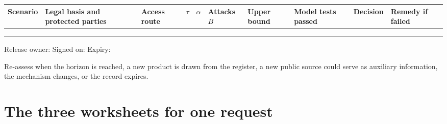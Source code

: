 \begin{center}
\footnotesize
\setlength{\tabcolsep}{2.5pt}
\begin{tabular}{@{}>{\raggedright\arraybackslash}p{1.5cm}>{\raggedright\arraybackslash}p{1.8cm}>{\raggedright\arraybackslash}p{1.3cm}>{\raggedright\arraybackslash}p{0.6cm}>{\raggedright\arraybackslash}p{0.6cm}>{\raggedright\arraybackslash}p{1.1cm}>{\raggedright\arraybackslash}p{1.5cm}>{\raggedright\arraybackslash}p{1.6cm}>{\raggedright\arraybackslash}p{1.6cm}>{\raggedright\arraybackslash}p{1.4cm}@{}}
\toprule
Scenario & Legal basis and protected parties & Access route & $\tau$ & $\alpha$ &
Attacks $B$ & Upper bound & Model tests passed & Decision & Remedy if
failed \\
\midrule
 & & & & & & & & & \\[12pt]
 & & & & & & & & & \\[12pt]
 & & & & & & & & & \\[12pt]
\bottomrule
\end{tabular}
\end{center}
\noindent Release owner: \hrulefill\quad Signed on: \hrulefill\quad Expiry:
\hrulefill

\noindent Re-assess when the horizon is reached, a new product is drawn from the
register, a new public source could serve as auxiliary information, the mechanism
changes, or the record expires.

\section{The three worksheets for one request}\label{c17:sec-filled}

